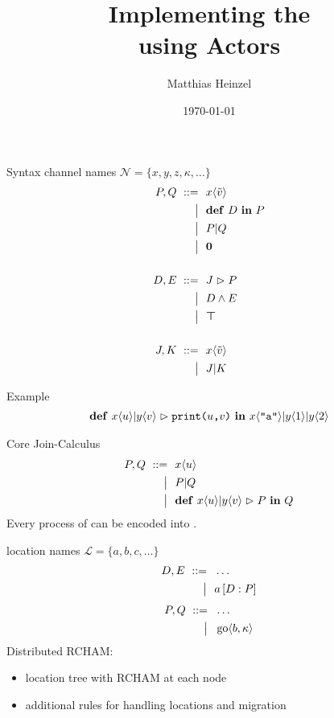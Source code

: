 \documentclass[]{beamer}
\title{Implementing the \DistJoinCalc\\using Actors}
\author{Matthias Heinzel}
\institute{Technical University Berlin}
\date{\today}
\begin{document}
  \frame{\titlepage}

  \frame{\tableofcontents}

  \section{\JoinCalc}

    \begin{frame}{Syntax}
      channel names $ \mathcal{N} = \{ x, y, z, \kappa, \ldots \} $
      \begin{align*}
        P, Q
        \ ::=&\ \  x\langle\tilde{v}\rangle
        \\ \big|&\ \  \nonumber \textbf{\textup{def}} \ D \ \textbf{\textup{in}} \ P
        \\ \big|&\ \  P | Q
        \\ \big|&\ \  \textbf{\textup{0}}
        \\ \nonumber
        \\
        D, E
        \ ::=&\ \  J \vartriangleright P
        \\ \big|&\ \  D \wedge E
        \\ \big|&\ \  \boldsymbol{\top}
        \\ \nonumber
        \\
        J, K
        \ ::=&\ \  x\langle\tilde{v}\rangle
        \\ \big|&\ \  J | K
      \end{align*}
    \end{frame}

    \begin{frame}{Example}
      \begin{align*}
      \textbf{\textup{def}} \ x\langle u\rangle | y\langle v\rangle \vartriangleright \texttt{print($u$,$v$)} \ \textbf{\textup{in}} \ x\langle\texttt{"a"}\rangle
        | y\langle1\rangle
        | y\langle2\rangle
      \end{align*}
    \end{frame}

    \begin{frame}{Core Join-Calculus}
      \begin{align*}
        P, Q
        \ ::=&\ \  x\langle u\rangle
        \\ \big|&\ \  P | Q
        \\ \big|&\ \  \textbf{\textup{def}} \ x\langle u\rangle | y\langle v\rangle \vartriangleright P \ \textbf{\textup{in}} \ Q
      \end{align*}
      Every process of \joincalc can be encoded into \corejoincalc.
    \end{frame}

    \begin{frame}{\DistJoinCalc}
      location names
      $ \mathcal{L} = \{ a, b, c, \ldots \} $
      \begin{align*}
        D, E
        \ ::=&\ \  \dots
        \\ \big|&\ \  a \left[ D : P \right]
      \end{align*}
      \begin{align*}
        P, Q
        \ ::=&\ \  \dots
        \\ \big|&\ \  \operatorname{go} \langle b, \kappa \rangle
      \end{align*}
      Distributed RCHAM:
      \begin{itemize}
        \item location tree with RCHAM at each node
        \item additional rules for handling locations and migration
      \end{itemize}
    \end{frame}
\end{document}
